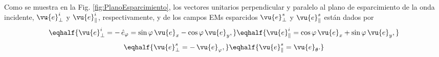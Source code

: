 Como se muestra en la Fig. \ref{fig:PlanoEsparcimiento}, los vectores unitarios perpendicular y paralelo al plano de esparcimiento de la onda incidente, $\vu{e}_{\perp}^i$  y $\vu{e}_{\parallel}^i$, respectivamente, y de los campos EMs esparcidos $\vu{e}_{\perp}^s$ y $\vu{e}_{\parallel}^s$ están dados por%
\begin{subequations} \index{Polarización!respecto al plano de esparcimiento!paralela ($\parallel$)}\index{Polarización!respecto al plano de esparcimiento!perpendicular ($\perp$)}\vspace*{-2em}

	\eqhalf{\vu{e}_{\perp}^i =-\, \hat{e}_\varphi  = \sin\varphi\,\vu{e}_x - \cos\varphi\,\vu{e}_y,}	
	\eqhalf{\vu{e}_{\parallel}^i = \cos\varphi\,\vu{e}_x + \sin\varphi\,\vu{e}_y,}	
	\label{eqs:vecInc}\end{subequations}	\begin{subequations}
	\eqhalf{\vu{e}_{\perp}^s= - \, \vu{e}_\varphi,}	
	\eqhalf{\vu{e}_{\parallel}^s = \vu{e}_\theta.}	
	\label{eqs:vecScat}\end{subequations}\vspace*{-1em}
	
